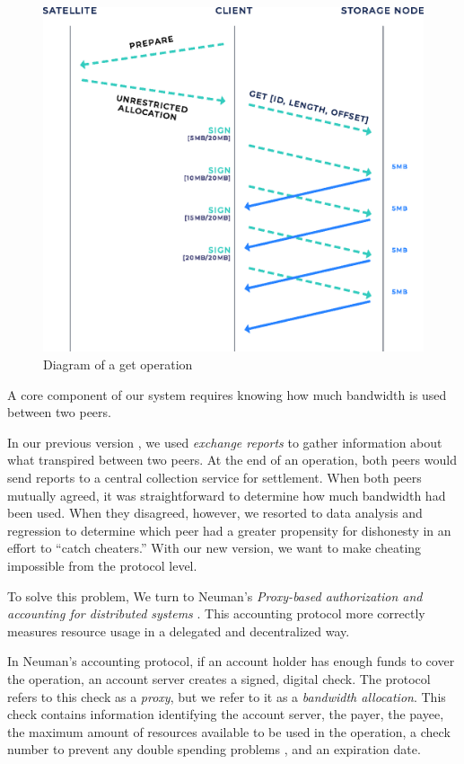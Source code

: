 \documentclass[8pt,fleqn,openany]{book}
\begin{document}
\begin{figure}[!htbp]
\centering
\includegraphics[height=.4\textheight]{images/get.eps}
\caption{Diagram of a get operation}
\label{fig:bap-get}
\end{figure}

A core component of our system requires knowing how much bandwidth is used
between two peers.

In our previous version \cite{storj-v2, sip9}, we used
{\em exchange reports} to gather information about what transpired between
two peers. At the end of an operation, both peers would send reports to a
central collection service for settlement. When both peers mutually agreed,
it was straightforward to determine how much bandwidth had been used.
When they disagreed, however, we resorted to data analysis and regression to
determine which peer had a greater propensity for dishonesty in an effort to
``catch cheaters.''
With our new version, we want to make cheating impossible from the protocol
level.

To solve this problem, We turn to Neuman's {\em Proxy-based authorization
and accounting for distributed systems} \cite{proxy-accounting}. This accounting
protocol more correctly measures resource usage in a delegated and decentralized
way.

In Neuman's accounting protocol, if an account holder has enough funds to
cover the operation, an account server creates a signed,
digital check. The protocol refers to this check as a {\em proxy}, but we refer
to it as a {\em bandwidth allocation}. This check contains information
identifying the account server, the payer, the payee, the maximum amount of
resources available to be used in the operation, a check number to prevent
any double spending problems \cite{schneier}, and an expiration date.
\end{document}
